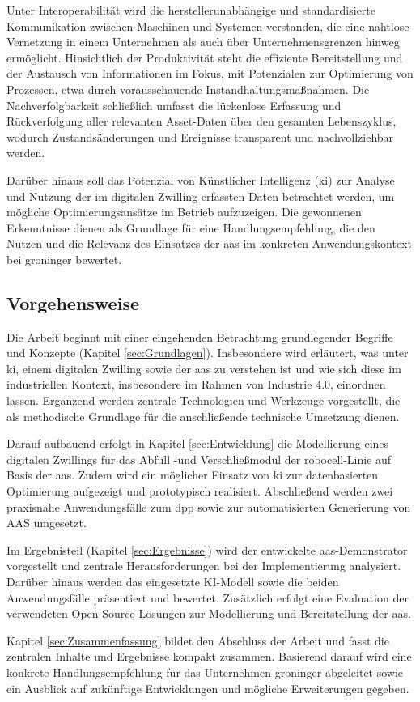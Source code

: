 Unter Interoperabilität wird die herstellerunabhängige und standardisierte Kommunikation zwischen Maschinen und Systemen verstanden, die eine nahtlose Vernetzung in einem Unternehmen als auch über Unternehmensgrenzen hinweg ermöglicht.
Hinsichtlich der Produktivität steht die effiziente Bereitstellung und der Austausch von Informationen im Fokus, mit Potenzialen zur Optimierung von Prozessen, etwa durch vorausschauende Instandhaltungsmaßnahmen. 
Die Nachverfolgbarkeit schließlich umfasst die lückenlose Erfassung und Rückverfolgung aller relevanten Asset-Daten über den gesamten Lebenszyklus, wodurch Zustandsänderungen und Ereignisse transparent und nachvollziehbar werden.

Darüber hinaus soll das Potenzial von Künstlicher Intelligenz (\acs{ki}) zur Analyse und Nutzung der im digitalen Zwilling erfassten Daten betrachtet werden, um mögliche Optimierungsansätze im Betrieb aufzuzeigen.
Die gewonnenen Erkenntnisse dienen als Grundlage für eine Handlungsempfehlung, die den Nutzen und die Relevanz des Einsatzes der \acs{aas} im konkreten Anwendungskontext bei groninger bewertet.

\subsection{Vorgehensweise}

Die Arbeit beginnt mit einer eingehenden Betrachtung grundlegender Begriffe und Konzepte (Kapitel \ref{sec:Grundlagen}).
Insbesondere wird erläutert, was unter \acs{ki}, einem digitalen Zwilling sowie der \acs{aas} zu verstehen ist und wie sich diese im industriellen Kontext, insbesondere im Rahmen von Industrie 4.0, einordnen lassen. 
Ergänzend werden zentrale Technologien und Werkzeuge vorgestellt, die als methodische Grundlage für die anschließende technische Umsetzung dienen.

Darauf aufbauend erfolgt in Kapitel \ref{sec:Entwicklung} die Modellierung eines digitalen Zwillings für das Abfüll -und Verschließmodul der robocell-Linie auf Basis der \acs{aas}.
Zudem wird ein möglicher Einsatz von \acs{ki} zur datenbasierten Optimierung aufgezeigt und prototypisch realisiert.
Abschließend werden zwei praxisnahe Anwendungsfälle zum \acs{dpp} sowie zur automatisierten Generierung von AAS umgesetzt.

Im Ergebnisteil (Kapitel \ref{sec:Ergebnisse}) wird der entwickelte \acs{aas}-Demonstrator vorgestellt und zentrale Herausforderungen bei der Implementierung analysiert.
Darüber hinaus werden das eingesetzte KI-Modell sowie die beiden Anwendungsfälle präsentiert und bewertet.
Zusätzlich erfolgt eine Evaluation der verwendeten Open-Source-Lösungen zur Modellierung und Bereitstellung der \acs{aas}.

Kapitel \ref{sec:Zusammenfassung} bildet den Abschluss der Arbeit und fasst die zentralen Inhalte und Ergebnisse kompakt zusammen. 
Basierend darauf wird eine konkrete Handlungsempfehlung für das Unternehmen groninger abgeleitet sowie ein Ausblick auf zukünftige Entwicklungen und mögliche Erweiterungen gegeben.

